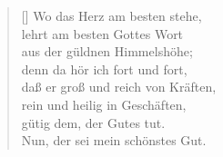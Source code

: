 \begin{multicols}{2}
\begin{verse}[\versewidth]
 Wo das Herz am besten stehe,\\
lehrt am besten Gottes Wort\\
aus der güldnen Himmelshöhe;\\
denn da hör ich fort und fort,\\
daß er groß und reich von Kräften,\\
rein und heilig in Geschäften,\\
gütig dem, der Gutes tut.\\
Nun, der sei mein schönstes Gut.

\end{verse}
\end{multicols}
